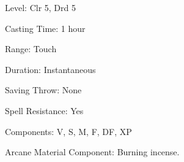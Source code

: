
\begin{description*}
\item[Level:] Clr 5, Drd 5
\item[Casting Time:] 1 hour
\item[Range:] Touch
\item[Duration:] Instantaneous
\item[Saving Throw:] None
\item[Spell Resistance:] Yes
\item[Components:] V, S, M, F, DF, XP
\item[Arcane Material Component:] Burning incense.
\end{description*}

